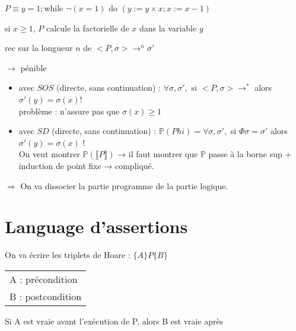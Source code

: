 \documentclass[10pt,a4paper]{article}
\newcommand{\semm}[1]{\llbracket #1 \rrbracket }
\newcommand{\Ps}{\mathbb{P}}
\begin{document}
\begin{ex}
 $P \equiv y=1;$while $\lnot (x=1)$ do $(y:=y \times x; x := x-1)$\\
\begin{minipage}[c]{150pt}
 \begin{propriete}\og si $x \geq 1$, $P$ calcule la factorielle de $x$ dans la variable $y$ \fg\end{propriete}
\end{minipage}\begin{minipage}[c]{150pt}
\begin{dem}
 rec sur la longueur $n$ de $<P, \sigma> →^n \sigma'$
\end{dem}\end{minipage}\hspace{1cm}\begin{minipage}[b]{100pt}
                        $\longrightarrow$ pénible
                       \end{minipage}


\begin{itemize}
 \item avec $SOS$ (directe, sans continuation) : $\forall \sigma, \sigma',$ si $<P, \sigma> →^*$ alors $\sigma'(y) = \sigma(x)$!\\
problème : n'assure pas que $\sigma(x) \geq 1$
\item avec $SD$ (directe, sans continuation) : $\Ps(Phi) = \forall \sigma, \sigma',$ si $\Phi \sigma = \sigma'$ alors $\sigma'(y) = \sigma(x)$ !\\
On veut montrer $\Ps(\semm{P})$ → il faut montrer que $\Ps$ passe à la borne sup + induction de point fixe → compliqué.
\end{itemize}
\end{ex}


$\Rightarrow$ On va dissocier la partie programme de la partie logique.

\section{Language d'assertions}
On va écrire les triplets de Hoare : $\{A\}P\{B\}$ \begin{tabular}{l}
                                                    A : précondition\\B : postcondition
                                                   \end{tabular}

\og Si A est vraie avant l'exécution de P, alors B est vraie après \fg 
\end{document}

